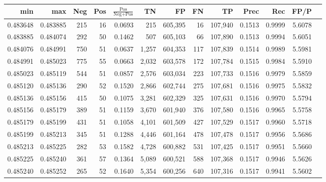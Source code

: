 \begin{tabular}{rrrrrrrrrrrrr}
\toprule
     min &      max & Neg & Pos & $\frac{\text{Pos}}{\text{Neg}+\text{Pos}}$ &      TN &      FP &      FN &      TP &   Prec &    Rec &   FP/P \\
\midrule
0.483648 & 0.483885 & 215 &  16 &                                     0.0693 &     215 & 605,395 &      16 & 107,940 & 0.1513 & 0.9999 & 5.6078 \\
0.483885 & 0.484074 & 292 &  50 &                                     0.1462 &     507 & 605,103 &      66 & 107,890 & 0.1513 & 0.9994 & 5.6051 \\
0.484076 & 0.484991 & 750 &  51 &                                     0.0637 &   1,257 & 604,353 &     117 & 107,839 & 0.1514 & 0.9989 & 5.5981 \\
0.484991 & 0.485023 & 775 &  55 &                                     0.0663 &   2,032 & 603,578 &     172 & 107,784 & 0.1515 & 0.9984 & 5.5910 \\
0.485023 & 0.485119 & 544 &  51 &                                     0.0857 &   2,576 & 603,034 &     223 & 107,733 & 0.1516 & 0.9979 & 5.5859 \\
0.485120 & 0.485136 & 290 &  52 &                                     0.1520 &   2,866 & 602,744 &     275 & 107,681 & 0.1516 & 0.9975 & 5.5832 \\
0.485136 & 0.485156 & 415 &  50 &                                     0.1075 &   3,281 & 602,329 &     325 & 107,631 & 0.1516 & 0.9970 & 5.5794 \\
0.485156 & 0.485179 & 389 &  51 &                                     0.1159 &   3,670 & 601,940 &     376 & 107,580 & 0.1516 & 0.9965 & 5.5758 \\
0.485179 & 0.485199 & 431 &  51 &                                     0.1058 &   4,101 & 601,509 &     427 & 107,529 & 0.1517 & 0.9960 & 5.5718 \\
0.485199 & 0.485213 & 345 &  51 &                                     0.1288 &   4,446 & 601,164 &     478 & 107,478 & 0.1517 & 0.9956 & 5.5686 \\
0.485213 & 0.485225 & 282 &  53 &                                     0.1582 &   4,728 & 600,882 &     531 & 107,425 & 0.1517 & 0.9951 & 5.5660 \\
0.485225 & 0.485240 & 361 &  57 &                                     0.1364 &   5,089 & 600,521 &     588 & 107,368 & 0.1517 & 0.9946 & 5.5626 \\
0.485240 & 0.485252 & 265 &  52 &                                     0.1640 &   5,354 & 600,256 &     640 & 107,316 & 0.1517 & 0.9941 & 5.5602 \\

\end{tabular}
